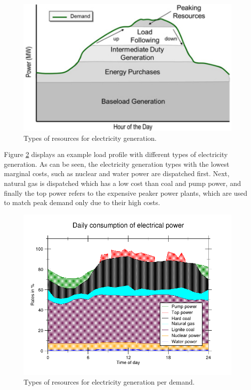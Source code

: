 \begin{figure}
	\centering
	\includegraphics[width=0.85\linewidth]{Chapter5/figures/peaker_plants}
	\caption{Types of resources for electricity generation.}
	\label{fig:peaker_plants}
\end{figure}


Figure \ref{fig:peaker_plants_types} displays an example load profile with different types of electricity generation. As can be seen, the electricity generation types with the lowest marginal costs, such as nuclear and water power are dispatched first. Next, natural gas is dispatched which has a low cost than coal and pump power, and finally the top power refers to the expensive peaker power plants, which are used to match peak demand only due to their high costs.

\begin{figure}
	\centering
	\includegraphics[width=0.85\linewidth]{Chapter5/figures/Tagesgang_engl}
	\caption{Types of resources for electricity generation per demand.}
	\label{fig:peaker_plants_types}
\end{figure}




